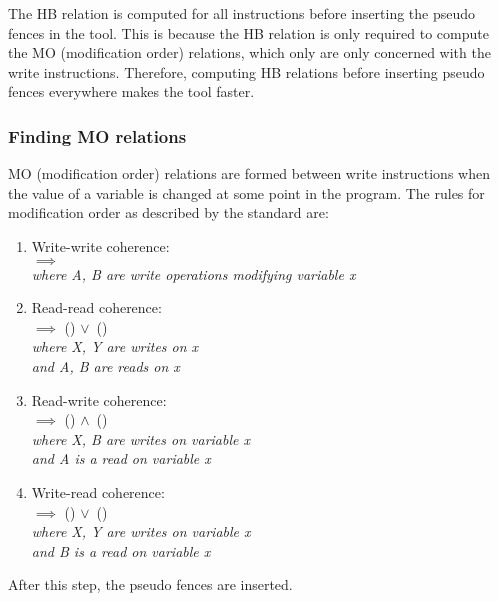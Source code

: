 \par
The HB relation is computed for all instructions before inserting the pseudo fences in the tool. This is because the HB relation is only required to compute the MO (modification order) relations, which only are only concerned with the write instructions. Therefore, computing HB relations before inserting pseudo fences everywhere makes the tool faster.

\subsubsection{Finding MO relations}
MO (modification order) relations are formed between write instructions when the value of a variable is changed at some point in the program. The rules for modification order as described by the standard are:
\begin{enumerate}
    \item Write-write coherence: \\
     $\implies$ \\
    \textit{where A, B are write operations modifying variable x}
    
    \item Read-read coherence:\\
     $\implies$ () $\lor$\ ()\\
    \textit{where X, Y are writes on x\\ and A, B are reads on x}
    
    \item Read-write coherence:\\
     $\implies$ () $\land$\ ()\\
    \textit{where X, B are writes on variable x\\and A is a read on variable x}
    
    \item Write-read coherence:\\
     $\implies$ () $\lor$\ ()\\
    \textit{where X, Y are writes on variable x\\and B is a read on variable x}
\end{enumerate}

\par
After this step, the pseudo fences are inserted.

